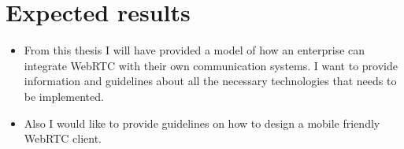 

\section{Expected results}

\begin{itemize}
    \item From this thesis I will have provided a model of how an enterprise can integrate WebRTC with their own communication systems. I want to provide information and guidelines about all the necessary technologies that needs to be implemented.
    \item Also I would like to provide guidelines on how to design a mobile friendly WebRTC client.
\end{itemize}

